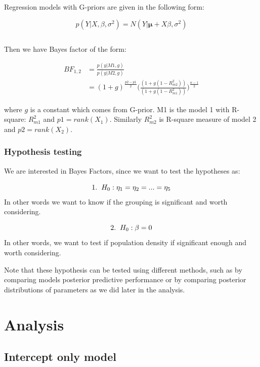 \documentclass[11pt,twocolumn]{asaproc}
\begin{document}
Regression models with G-priors are given in the following form:

$$p(Y | X, \beta, \sigma^2) = N(Y | \pmb{\mu} + X\beta, \sigma^2)$$

$$ $$



Then we have Bayes factor of the form: 

\begin{align*}
BF_{1,2} & = \frac{p(y | M1, g)}{p(y | M2, g)} \\
&= (1+g)^{\frac{p2-p1}{2}}\Big(\frac{(1+g(1-R^2_{m2}))}{(1+g(1-R^2_{m1}))}\Big)^{\frac{n-1}{2}}
\end{align*}

where $g$ is a constant which comes from G-prior. M1 is the model 1 with R-square: $R^2_{m1}$ and $p1 = rank(X_1)$. Similarly $R^2_{m2}$ is R-square measure of model 2 and $p2 = rank(X_2)$. 



\subsubsection{Hypothesis testing}
We are interested in Bayes Factors, since we want to test the hypotheses as: 

$$1. \hspace{2mm} H_0: \eta_1 = \eta_2 = ... = \eta_5$$ In other words we want to know if the grouping is significant and worth considering. 

$$2. \hspace{2mm} H_0: \beta = 0$$ In other words, we want to test if population density if significant enough and worth considering. 

Note that these hypothesis can be tested using different methods, such as by comparing models posterior predictive performance or by comparing posterior distributions of parameters as we did later in the analysis. 









\section{Analysis} %

\subsection{Intercept only model}
\end{document}
